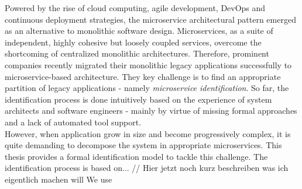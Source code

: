 

\Abstract
Powered by the rise of cloud computing, agile development, DevOps and continuous deployment strategies, the microservice architectural pattern emerged as an alternative to monolithic software design. Microservices, as a suite of independent, highly cohesive but loosely coupled services, overcome the shortcoming of centralized monolithic architectures. Therefore, prominent companies recently migrated their monolithic legacy applications successfully to microservice-based architecture. They key challenge is to find an appropriate partition of legacy applications - namely \textit{microservice identification}. So far, the identification process is done intuitively based on the experience of system architects and software engineers - mainly by virtue of missing formal approaches and a lack of automated tool support. \\
However, when application grow in size and become progressively complex, it is quite demanding to decompose the system in appropriate microservices.
This thesis provides a formal identification model to tackle this challenge. The identification process is based on... // Hier jetzt noch kurz beschreiben was ich eigentlich machen will
We use 




